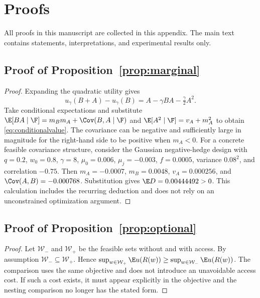 \clearpage\appendix
\section{Proofs}\label{app:proofs}
All proofs in this manuscript are collected in this appendix. The main text contains statements, interpretations, and experimental results only.

\subsection{Proof of Proposition~\ref{prop:marginal}}
\begin{proof}
Expanding the quadratic utility gives
\[
 u_\gamma(B+A)-u_\gamma(B)=A-\gamma BA-\tfrac\gamma2 A^2.
\]
Take conditional expectations and substitute
$\E[BA\mid\F]=m_Bm_A+\Cov(B,A\mid\F)$ and
$\E[A^2\mid\F]=v_A+m_A^2$ to obtain \eqref{eq:conditionalvalue}.
The covariance can be negative and sufficiently large in magnitude for the right-hand side to be positive when $m_A<0$.
For a concrete feasible covariance structure, consider the Gaussian negative-hedge design with $q=0.2$, $w_0=0.8$, $\gamma=8$, $\mu_0=0.006$, $\mu_j=-0.003$, $f=0.0005$, variance $0.08^2$, and correlation $-0.75$. Then $m_A=-0.0007$, $m_B=0.0048$, $v_A=0.000256$, and $\Cov(A,B)=-0.000768$. Substitution gives $\E D=0.00444492>0$. This calculation includes the recurring deduction and does not rely on an unconstrained optimization argument.
\end{proof}

\subsection{Proof of Proposition~\ref{prop:optional}}
\begin{proof}
Let $\mathcal W_-$ and $\mathcal W_+$ be the feasible sets without and with access. By assumption $\mathcal W_-\subseteq\mathcal W_+$. Hence
$\sup_{w\in\mathcal W_+}\E u(R(w))\ge\sup_{w\in\mathcal W_-}\E u(R(w))$.
The comparison uses the same objective and does not introduce an unavoidable access cost. If such a cost exists, it must appear explicitly in the objective and the nesting comparison no longer has the stated form.
\end{proof}


